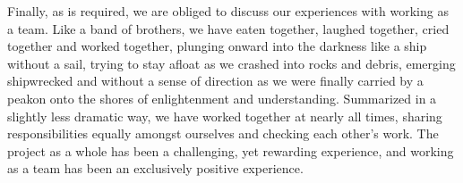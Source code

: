 Finally, as is required, we are obliged to discuss our experiences with working as a team. Like a band of brothers, we have eaten together, laughed together, cried together and worked together, plunging onward into the darkness like a ship without a sail, trying to stay afloat as we crashed into rocks and debris, emerging shipwrecked and without a sense of direction as we were finally carried by a peakon onto the shores of enlightenment and understanding. Summarized in a slightly less dramatic way, we have worked together at nearly all times, sharing responsibilities equally amongst ourselves and checking each other's work. The project as a whole has been a challenging, yet rewarding experience, and working as a team has been an exclusively positive experience.